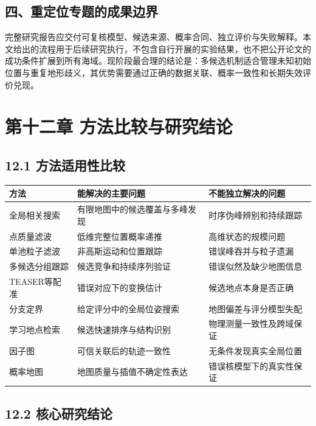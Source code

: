 \hypertarget{ux56dbux91cdux5b9aux4f4dux4e13ux9898ux7684ux6210ux679cux8fb9ux754c}{%
\subsection{四、重定位专题的成果边界}\label{ux56dbux91cdux5b9aux4f4dux4e13ux9898ux7684ux6210ux679cux8fb9ux754c}}

完整研究报告应交付可复核模型、候选来源、概率合同、独立评价与失败解释。本文给出的流程用于后续研究执行，不包含自行开展的实验结果，也不把公开论文的成功条件扩展到所有海域。现阶段最合理的结论是：多候选机制适合管理未知初始位置与重复地形歧义，其优势需要通过正确的数据关联、概率一致性和长期失效评价兑现。

\hypertarget{ux7b2cux5341ux4e8cux7ae0-ux65b9ux6cd5ux6bd4ux8f83ux4e0eux7814ux7a76ux7ed3ux8bba}{%
\section{第十二章 方法比较与研究结论}\label{ux7b2cux5341ux4e8cux7ae0-ux65b9ux6cd5ux6bd4ux8f83ux4e0eux7814ux7a76ux7ed3ux8bba}}

\hypertarget{ux65b9ux6cd5ux9002ux7528ux6027ux6bd4ux8f83}{%
\subsection{12.1 方法适用性比较}\label{ux65b9ux6cd5ux9002ux7528ux6027ux6bd4ux8f83}}

\begin{longtable}[]{@{}lll@{}}
\toprule
方法 & 能解决的主要问题 & 不能独立解决的问题\tabularnewline
\midrule
\endhead
全局相关搜索 & 有限地图中的候选覆盖与多峰发现 & 时序伪峰辨别和持续跟踪\tabularnewline
点质量滤波 & 低维完整位置概率递推 & 高维状态的规模问题\tabularnewline
单池粒子滤波 & 非高斯运动和位置跟踪 & 错误峰吞并与粒子遗漏\tabularnewline
多候选分组跟踪 & 候选竞争和持续序列验证 & 错误似然及缺少地图信息\tabularnewline
TEASER等配准 & 错误对应下的变换估计 & 候选地点本身是否正确\tabularnewline
分支定界 & 给定评分中的全局位姿搜索 & 地图偏差与评分模型失配\tabularnewline
学习地点检索 & 候选快速排序与结构识别 & 物理测量一致性及跨域保证\tabularnewline
因子图 & 可信关联后的轨迹一致性 & 无条件发现真实全局位置\tabularnewline
概率地图 & 地图质量与插值不确定性表达 & 错误核模型下的真实性保证\tabularnewline
\bottomrule
\end{longtable}

\hypertarget{ux6838ux5fc3ux7814ux7a76ux7ed3ux8bba}{%
\subsection{12.2 核心研究结论}\label{ux6838ux5fc3ux7814ux7a76ux7ed3ux8bba}}

